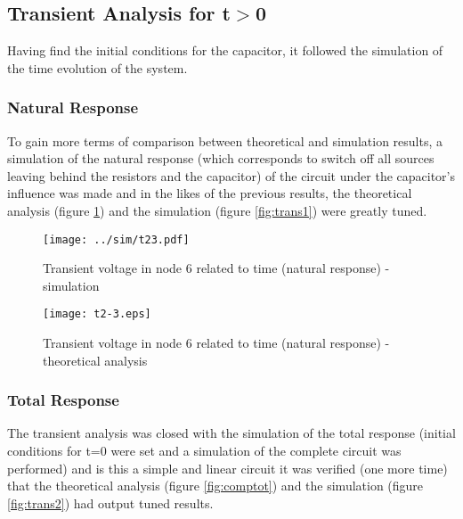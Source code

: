 

\subsection{Transient Analysis for t$>$0}

Having find the initial conditions for the capacitor, it followed the simulation of the time evolution of the system.

\subsubsection{Natural Response}

To gain more terms of comparison between theoretical and simulation results, a simulation of the natural response (which corresponds to switch off all sources leaving behind the resistors and the capacitor) of the circuit under the capacitor's influence was made and in the likes of the previous results, the theoretical analysis (figure \ref{fig:compnat}) and the simulation (figure \ref{fig:trans1}) were greatly tuned.

\begin{figure}[h] \centering
  \begin{minipage}{.5\textwidth}
    \texttt{[image: ../sim/t23.pdf]}
    \caption{Transient voltage in node 6 related to time (natural response) - simulation}
    \label{fig:trans1}
    \end{minipage}%
  \begin{minipage}{.5\textwidth}
    \vspace{10mm}
  \centering
    \texttt{[image: t2-3.eps]}
    \caption{Transient voltage in node 6 related to time (natural response) - theoretical analysis}
    \label{fig:compnat}
      \end{minipage}%
\end{figure}

\subsubsection{Total Response}
The transient analysis was closed with the simulation of the total response (initial conditions for t=0 were set and a simulation of the complete circuit was performed) and is this a simple and linear circuit it was verified (one more time) that the theoretical analysis (figure \ref{fig:comptot}) and the simulation (figure \ref{fig:trans2}) had output tuned results.

